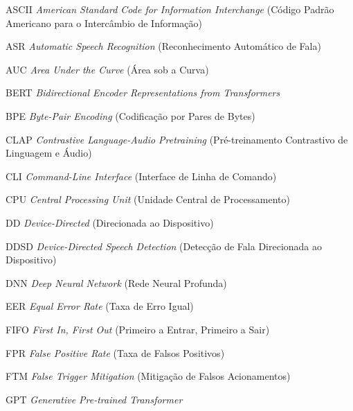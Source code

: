 \documentclass[
    12pt,                %
    openright,           %
    oneside,             %
    a4paper,             %
    english,             %
    brazil               %
]{abntex2}
\begin{document}
\listoffigures*
\cleardoublepage

\listoftables*
\cleardoublepage

\begin{siglas}
  \item[ASCII] \textit{American Standard Code for Information Interchange} (Código Padrão Americano para o Intercâmbio de Informação)
  \item[ASR] \textit{Automatic Speech Recognition} (Reconhecimento Automático de Fala)
  \item[AUC] \textit{Area Under the Curve} (Área sob a Curva)
  \item[BERT] \textit{Bidirectional Encoder Representations from Transformers}
  \item[BPE] \textit{Byte-Pair Encoding} (Codificação por Pares de Bytes)
  \item[CLAP] \textit{Contrastive Language-Audio Pretraining} (Pré-treinamento Contrastivo de Linguagem e Áudio)
  \item[CLI] \textit{Command-Line Interface} (Interface de Linha de Comando)
  \item[CPU] \textit{Central Processing Unit} (Unidade Central de Processamento)
  \item[DD] \textit{Device-Directed} (Direcionada ao Dispositivo)
  \item[DDSD] \textit{Device-Directed Speech Detection} (Detecção de Fala Direcionada ao Dispositivo)
  \item[DNN] \textit{Deep Neural Network} (Rede Neural Profunda)
  \item[EER] \textit{Equal Error Rate} (Taxa de Erro Igual)
  \item[FIFO] \textit{First In, First Out} (Primeiro a Entrar, Primeiro a Sair)
  \item[FPR] \textit{False Positive Rate} (Taxa de Falsos Positivos)
  \item[FTM] \textit{False Trigger Mitigation} (Mitigação de Falsos Acionamentos)
  \item[GPT] \textit{Generative Pre-trained Transformer}

\end{siglas}
\end{document}
